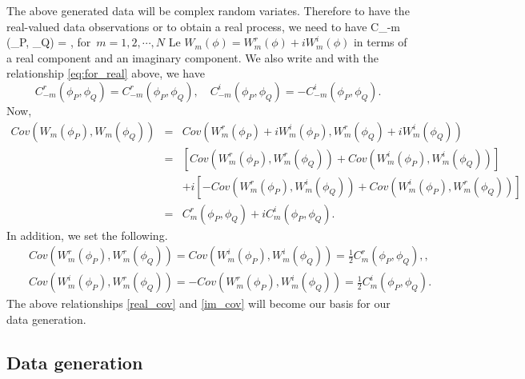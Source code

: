 	The above generated data will be complex random variates. Therefore to have the real-valued data observations or to obtain a real process, we need to have
	\beq \label{eq:for_real}
	C_{-m} (\phi_P, \phi_Q) = , \quad \mbox{for $m = 1, 2, \cdots, N$}
	\eeq
	Le $W_m(\phi) = W_{m}^{r}(\phi) + i W_{m}^i(\phi)$ in terms of a real component and an imaginary component. We also write 
	and with the relationship \ref{eq:for_real} above, we have
	\[
		C_{-m}^r(\phi_P, \phi_Q) = C_{-m}^r(\phi_P, \phi_Q), \quad C_{-m}^i(\phi_P, \phi_Q) = - C_{-m}^i(\phi_P, \phi_Q).
	\]
	Now,
	\begin{eqnarray*}
		Cov(W_m(\phi_P), {W_m(\phi_Q)}) &=& Cov(W_m^r(\phi_P) + iW_m^i(\phi_P), W_m^r(\phi_Q) + i W_m^i(\phi_Q)) \\
		&=& \left[Cov(W_m^r(\phi_P), W_m^r(\phi_Q)) + Cov(W_m^i(\phi_P), W_m^i(\phi_Q))\right] \\
		& & + i\left[- Cov(W_m^r(\phi_P), W_m^i(\phi_Q)) + Cov(W_m^i(\phi_P), W_m^r(\phi_Q))\right] \\
		&=& C_m^r(\phi_P, \phi_Q) + i C_m^i(\phi_P, \phi_Q).
	\end{eqnarray*}
	In addition, we set the following.		
	\begin{eqnarray} \label{real_cov}
		& & Cov(W_m^r(\phi_P), W_m^r(\phi_Q)) = Cov(W_m^i(\phi_P), W_m^i(\phi_Q)) = \frac{1}{2}C_m^r(\phi_P, \phi_Q), \label{real_cov}, \\
		& & Cov(W_m^i(\phi_P), W_m^r(\phi_Q)) = - Cov(W_m^r(\phi_P), W_m^i(\phi_Q)) = \frac{1}{2}C_m^i(\phi_P, \phi_Q). \label{im_cov}
	\end{eqnarray}
The above relationships \eqref{real_cov} and \eqref{im_cov} will become our basis for our data generation.\\
	
	\subsection{Data generation}
	
